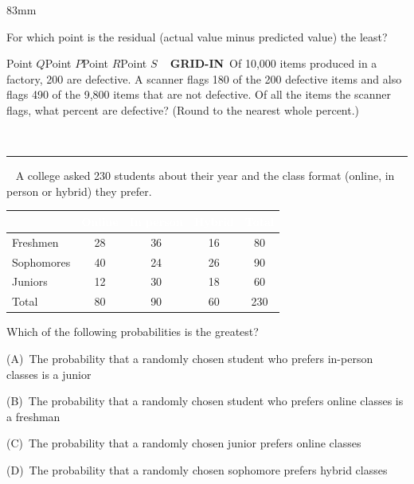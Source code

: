 \documentclass[a4paper]{article}
\newcommand{\COLW}{83mm}
\newcommand{\pnum}[1]{\fcolorbox{ink}{white}{\sffamily\bfseries\fontsize{8}{8}\selectfont #1}~}
\newcommand{\satqw}[6]{%
\noindent\pnum{#1} #2\par\nobreak\vspace{2mm}%
\noindent\hspace*{7mm}(A) #3\par\vspace{1.6mm}%
\noindent\hspace*{7mm}(B) #4\par\vspace{1.6mm}%
\noindent\hspace*{7mm}(C) #5\par\vspace{1.6mm}%
\noindent\hspace*{7mm}(D) #6\par\vspace{5.5mm}%
}
\newcommand{\satg}[2]{%
\noindent\pnum{#1} {\sffamily\bfseries\fontsize{7}{8}\selectfont\color{accent}GRID-IN}\ #2\par\nobreak\vspace{2.5mm}%
\noindent\hspace*{7mm}{\sffamily\fontsize{8.5}{10}\selectfont Answer:}\ \rule[-1.2mm]{28mm}{0.4pt}\par\vspace{5.5mm}%
}
\renewcommand{\arraystretch}{1.3}
\renewcommand{\satqw}[6]{%
\noindent\pnum{#1} #2\par\nobreak\vspace{2mm}%
\noindent\hangindent=13mm\hangafter=1\hspace*{7mm}(A)~#3\par\vspace{1.6mm}%
\noindent\hangindent=13mm\hangafter=1\hspace*{7mm}(B)~#4\par\vspace{1.6mm}%
\noindent\hangindent=13mm\hangafter=1\hspace*{7mm}(C)~#5\par\vspace{1.6mm}%
\noindent\hangindent=13mm\hangafter=1\hspace*{7mm}(D)~#6\par\vspace{5.5mm}%
}
\begin{document}
\begin{textblock*}{\COLW}
{{\begin{center}
\end{center}For which point is the residual (actual value minus predicted value) the least?}{Point $Q$}{Point $P$}{Point $R$}{Point $S$}
\satg{7}{Of 10,000 items produced in a factory, 200 are defective. A scanner flags 180 of the 200 defective items and also flags 490 of the 9,800 items that are not defective. Of all the items the scanner flags, what percent are defective? (Round to the nearest whole percent.)}
\satqw{8}{A college asked 230 students about their year and the class format (online, in person or hybrid) they prefer.\begin{center}{\small\renewcommand{\arraystretch}{1.15}\setlength{\tabcolsep}{4.5pt}
\begin{tabular}{|l|c|c|c|c|}\hline
\cellcolor{accent}\textcolor{white}{\bfseries } & \cellcolor{accent}\textcolor{white}{\bfseries Online} & \cellcolor{accent}\textcolor{white}{\bfseries In person} & \cellcolor{accent}\textcolor{white}{\bfseries Hybrid} & \cellcolor{accent}\textcolor{white}{\bfseries Total}\\ \hline
Freshmen & 28 & 36 & 16 & 80\\ \hline
Sophomores & 40 & 24 & 26 & 90\\ \hline
Juniors & 12 & 30 & 18 & 60\\ \hline
Total & 80 & 90 & 60 & 230\\ \hline
\end{tabular}}\end{center}Which of the following probabilities is the greatest?}{The probability that a randomly chosen student who prefers in-person classes is a junior}{The probability that a randomly chosen student who prefers online classes is a freshman}{The probability that a randomly chosen junior prefers online classes}{The probability that a randomly chosen sophomore prefers hybrid classes}
}
\end{textblock*}
\end{document}
